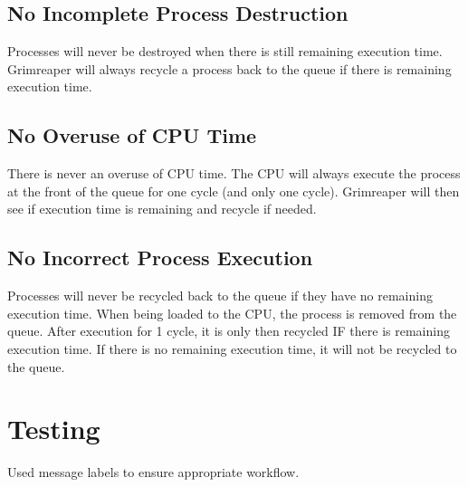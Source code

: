 \documentclass[]{article}
\begin{document}
\vspace{2mm}

\subsection*{No Incomplete Process Destruction}
Processes will never be destroyed when there is still remaining execution time. Grimreaper will always recycle a process back to the queue if there is remaining execution time. 

\vspace{2mm}

\subsection*{No Overuse of CPU Time}
There is never an overuse of CPU time. The CPU will always execute the process at the front of the queue for one cycle (and only one cycle). Grimreaper will then see if execution time is remaining and recycle if needed. 

\vspace{2mm}

\subsection*{No Incorrect Process Execution}
Processes will never be recycled back to the queue if they have no remaining execution time. When being loaded to the CPU, the process is removed from the queue. After execution for 1 cycle, it is only then recycled IF there is remaining execution time. If there is no remaining execution time, it will not be recycled to the queue.  

\vspace{2mm}

\section*{Testing}
Used message labels to ensure appropriate workflow. 
\end{document}
